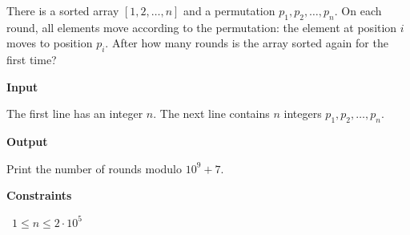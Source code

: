 There is a sorted array $[1,2,\dots,n]$ and a permutation $p_1,p_2,\dots,p_n$. On each round, all elements move according to the permutation: the element at position $i$ moves to position $p_i$.
After how many rounds is the array sorted again for the first time?

\vspace{0.3cm}\noindent\textbf{Input}

The first line has an integer $n$.
The next line contains $n$ integers $p_1,p_2,\dots,p_n$.

\vspace{0.3cm}\noindent\textbf{Output}

Print the number of rounds modulo $10^9+7$.

\vspace{0.3cm}\noindent\textbf{Constraints}

\textbullet\ $1 \le n \le 2 \cdot 10^5$